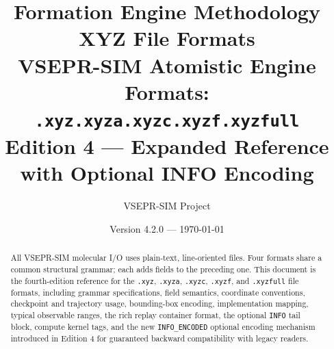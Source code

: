 \documentclass[12pt, a4paper, oneside]{article}
\title{%
  \textbf{Formation Engine Methodology}\\[6pt]
  \textbf{XYZ File Formats}\\[10pt]
  \large VSEPR-SIM Atomistic Engine\\
  Formats: \texttt{.xyz}\quad\texttt{.xyza}\quad\texttt{.xyzc}\quad\texttt{.xyzf}\quad\texttt{.xyzfull}\\[4pt]
  \normalsize Edition 4 --- Expanded Reference with Optional INFO Encoding
}
\author{VSEPR-SIM Project}
\date{Version 4.2.0 --- \today}
\begin{document}
\maketitle

\begin{abstract}
All VSEPR-SIM molecular I/O uses plain-text, line-oriented files.
Four formats share a common structural grammar; each adds fields to
the preceding one.  This document is the fourth-edition reference
for the \texttt{.xyz}, \texttt{.xyza}, \texttt{.xyzc},
\texttt{.xyzf}, and \texttt{.xyzfull} file formats, including grammar
specifications, field semantics, coordinate conventions, checkpoint and
trajectory usage, bounding-box encoding, implementation mapping, typical
observable ranges, the rich replay container format, the optional
\texttt{INFO} tail block, compute kernel tags, and the new
\texttt{INFO\_ENCODED} optional encoding mechanism introduced in Edition 4
for guaranteed backward compatibility with legacy readers.
\end{abstract}

\tableofcontents


\newpage
\thispagestyle{fancy}
\end{document}
